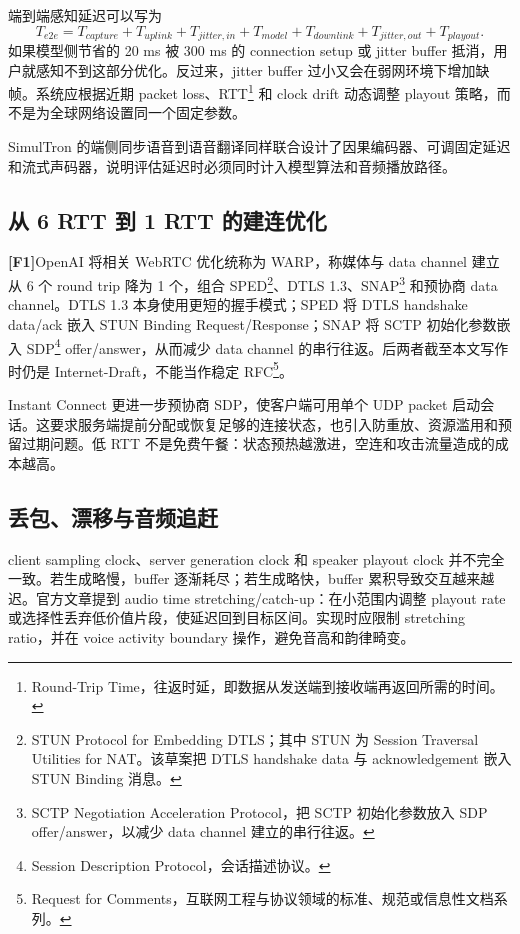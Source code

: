 \documentclass[UTF8,fontset=none,a4paper,10pt]{ctexart}
\newcommand{\FOne}{\textcolor{official}{\textbf{[F1]}}}
\begin{document}
端到端感知延迟可以写为
\begin{equation}
T_{e2e}=T_{capture}+T_{uplink}+T_{jitter,in}+T_{model}+T_{downlink}+T_{jitter,out}+T_{playout}.
\end{equation}
如果模型侧节省的 20 ms 被 300 ms 的 connection setup 或 jitter buffer 抵消，用户就感知不到这部分优化。反过来，jitter buffer 过小又会在弱网环境下增加缺帧。系统应根据近期 packet loss、RTT\footnote{Round-Trip Time，往返时延，即数据从发送端到接收端再返回所需的时间。} 和 clock drift 动态调整 playout 策略，而不是为全球网络设置同一个固定参数。

SimulTron 的端侧同步语音到语音翻译同样联合设计了因果编码器、可调固定延迟和流式声码器\cite{agranovich2024simultron}，说明评估延迟时必须同时计入模型算法和音频播放路径。

\subsection{从 6 RTT 到 1 RTT 的建连优化}

\FOne OpenAI 将相关 WebRTC 优化统称为 WARP，称媒体与 data channel 建立从 6 个 round trip 降为 1 个，组合 SPED\footnote{STUN Protocol for Embedding DTLS；其中 STUN 为 Session Traversal Utilities for NAT。该草案把 DTLS handshake data 与 acknowledgement 嵌入 STUN Binding 消息。}、DTLS 1.3、SNAP\footnote{SCTP Negotiation Acceleration Protocol，把 SCTP 初始化参数放入 SDP offer/answer，以减少 data channel 建立的串行往返。} 和预协商 data channel\cite{openai2026continuous}。DTLS 1.3 本身使用更短的握手模式\cite{rescorla2022dtls13}；SPED 将 DTLS handshake data/ack 嵌入 STUN Binding Request/Response；SNAP 将 SCTP 初始化参数嵌入 SDP\footnote{Session Description Protocol，会话描述协议。} offer/answer，从而减少 data channel 的串行往返\cite{hancke2026sped,hancke2026snap}。后两者截至本文写作时仍是 Internet-Draft，不能当作稳定 RFC\footnote{Request for Comments，互联网工程与协议领域的标准、规范或信息性文档系列。}。

Instant Connect 更进一步预协商 SDP，使客户端可用单个 UDP packet 启动会话\cite{openai2026continuous}。这要求服务端提前分配或恢复足够的连接状态，也引入防重放、资源滥用和预留过期问题。低 RTT 不是免费午餐：状态预热越激进，空连和攻击流量造成的成本越高。

\subsection{丢包、漂移与音频追赶}

client sampling clock、server generation clock 和 speaker playout clock 并不完全一致。若生成略慢，buffer 逐渐耗尽；若生成略快，buffer 累积导致交互越来越迟。官方文章提到 audio time stretching/catch-up\cite{openai2026continuous}：在小范围内调整 playout rate 或选择性丢弃低价值片段，使延迟回到目标区间。实现时应限制 stretching ratio，并在 voice activity boundary 操作，避免音高和韵律畸变。
\end{document}
